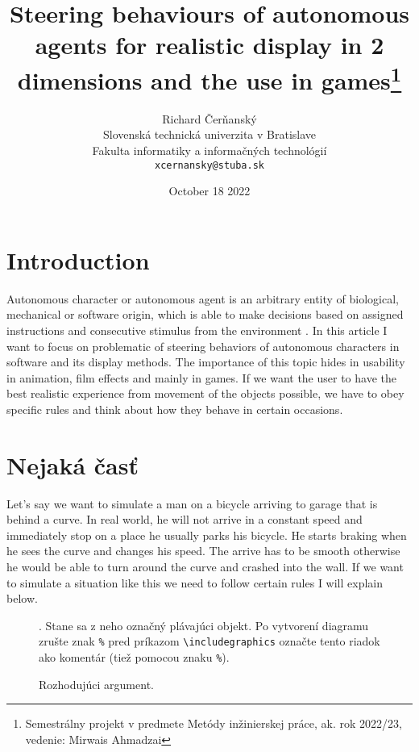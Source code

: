 \documentclass[10pt,twoside,slovak,a4paper]{article}
\title{Steering behaviours of autonomous agents for realistic display in 2 dimensions and the use in games\thanks{Semestrálny projekt v predmete Metódy inžinierskej práce, ak. rok 2022/23, vedenie: Mirwais Ahmadzai}}
\author{Richard Čerňanský\\[2pt]
	{\small Slovenská technická univerzita v Bratislave}\\
	{\small Fakulta informatiky a informačných technológií}\\
	{\small \texttt{xcernansky@stuba.sk}}
	}
\date{\small October 18 2022 }
\begin{document}
\maketitle

\begin{abstract}

\end{abstract}



\section{Introduction}
\quad  Autonomous character or autonomous agent is an arbitrary entity of biological, mechanical or software origin, which is able to make decisions based on assigned instructions and consecutive stimulus from the environment . In this article I want to focus on problematic of steering behaviors of autonomous characters in software and its display methods. The importance of this topic hides in usability in animation, film effects and mainly in games. If we want the user to have the best realistic experience from movement of the objects possible, we have to obey specific rules and think about how they behave in certain occasions. 




\section{Nejaká časť} \label{nejaka}

Let’s say we want to simulate a man on a bicycle arriving to garage that is behind a curve. In real world, he will not arrive in a constant speed and immediately stop on a place he usually parks his bicycle. He starts braking when he sees the curve and changes his speed. The arrive has to be smooth otherwise he would be able to turn around the curve and crashed into the wall. If we want to simulate a situation like this we need to follow certain rules I will explain below.

\begin{figure*}[tbh]
\centering
. Stane sa z neho označný plávajúci objekt. Po vytvorení diagramu zrušte znak \texttt{\%} pred príkazom \verb|\includegraphics| označte tento riadok ako komentár (tiež pomocou znaku \texttt{\%}).
\caption{Rozhodujúci argument.}
\label{f:rozhod}
\end{figure*}
\end{document}
